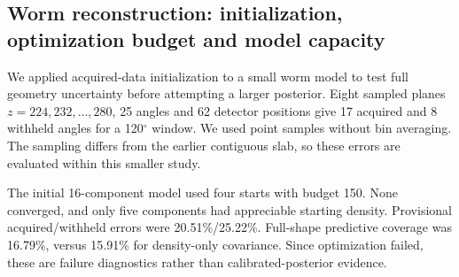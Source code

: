 \documentclass[11pt,a4paper]{article}
\newcommand{\degree}{\ensuremath{^{\circ}}}
\begin{document}
\subsection{Worm reconstruction: initialization, optimization budget and model capacity}
We applied acquired-data initialization to a small worm model to test full geometry uncertainty before attempting a larger posterior. Eight sampled planes $z=224,232,\ldots,280$, 25 angles and 62 detector positions give 17 acquired and 8 withheld angles for a 120\degree{} window. We used point samples without bin averaging. The sampling differs from the earlier contiguous slab, so these errors are evaluated within this smaller study.

The initial 16-component model used four starts with budget 150. None converged, and only five components had appreciable starting density. Provisional acquired/withheld errors were 20.51\%/25.22\%. Full-shape predictive coverage was 16.79\%, versus 15.91\% for density-only covariance. Since optimization failed, these are failure diagnostics rather than calibrated-posterior evidence.
\end{document}
